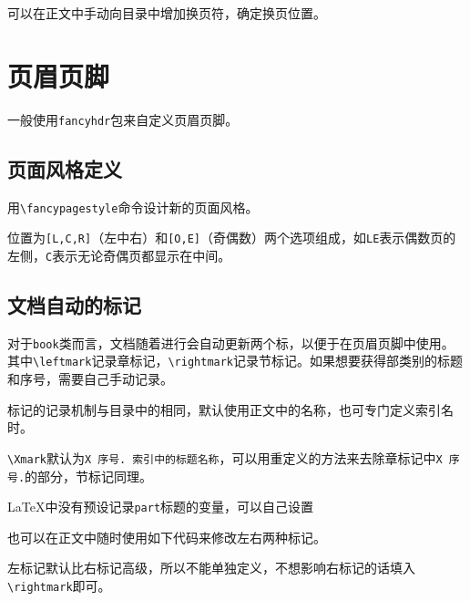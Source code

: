\documentclass[10pt,openany]{book}
\begin{document}
\begin{sloppypar}
可以在正文中手动向目录中增加换页符，确定换页位置。



\chapter{页眉页脚}
\label{hf}

一般使用\texttt{fancyhdr}包来自定义页眉页脚。

\section{页面风格定义}

用\texttt{\textbackslash{}fancypagestyle}命令设计新的页面风格。



位置为\texttt{{[}L,C,R{]}}（左中右）和\texttt{{[}O,E{]}}（奇偶数）两个选项组成，如\texttt{LE}表示偶数页的左侧，\texttt{C}表示无论奇偶页都显示在中间。

\section{文档自动的标记}

对于\texttt{book}类而言，文档随着进行会自动更新两个标，以便于在页眉页脚中使用。其中\texttt{\textbackslash{}leftmark}记录章标记，\texttt{\textbackslash{}rightmark}记录节标记。如果想要获得部类别的标题和序号，需要自己手动记录。

标记的记录机制与目录中的相同，默认使用正文中的名称，也可专门定义索引名时。



\texttt{\textbackslash{}Xmark}默认为\texttt{X\ 序号.\ 索引中的标题名称}，可以用重定义的方法来去除章标记中\texttt{X\ 序号.}的部分，节标记同理。



{\LaTeX}中没有预设记录\texttt{part}标题的变量，可以自己设置



也可以在正文中随时使用如下代码来修改左右两种标记。



左标记默认比右标记高级，所以不能单独定义，不想影响右标记的话填入\texttt{\textbackslash{}rightmark}即可。


\end{sloppypar}
\end{document}
